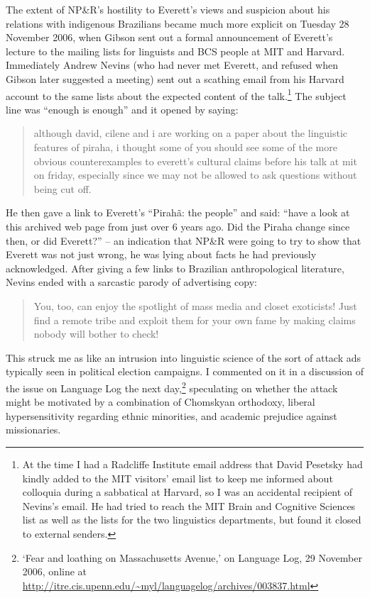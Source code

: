 \documentclass[output=paper,colorlinks,citecolor=brown
]{langscibook}
\begin{document}
The extent of NP\&R's hostility to Everett's views and suspicion about
his relations with indigenous Brazilians became much more explicit
on Tuesday 28 November 2006, when Gibson sent out a formal announcement
of Everett's lecture to the mailing lists for linguists and BCS people
at MIT and Harvard. Immediately Andrew Nevins (who had never met
Everett, and refused when Gibson later suggested a meeting) sent out
a scathing email from his Harvard account to the same lists about the
expected content of the talk.\footnote{\label{recipient}%
   At the time I had a Radcliffe Institute email address that David
   Pesetsky had kindly added to the MIT visitors' email list to keep
   me informed about colloquia during a sabbatical at Harvard, so I
   was an accidental recipient of Nevins's email. He had tried to reach
   the MIT Brain and Cognitive Sciences list as well as the lists for
   the two linguistics departments, but found it closed to external
   senders.}
The subject line was ``enough is enough'' and it opened by saying:
\begin{quote}
although david, cilene and i are working on a paper about the
linguistic features of piraha, i thought some of you should see
some of the more obvious counterexamples to everett's cultural
claims before his talk at mit on friday, especially since we may
not be allowed to ask questions without being cut off.
\end{quote}
He then gave a link to Everett's ``Pirah{\~a}: the people'' and said:
``have a look at this archived web page from just over 6 years ago.
Did the Piraha change since then, or did Everett?'' -- an indication
that NP\&R were going to try to show that Everett was not just wrong,
he was lying about facts he had previously acknowledged. After giving
a few links to Brazilian anthropological literature,  Nevins ended
with a sarcastic parody of advertising copy:
\begin{quote}
You, too, can enjoy the spotlight of mass media
and closet exoticists! Just find a remote tribe and exploit them
for your own fame by making claims nobody will bother to check!
\end{quote}

This struck me as like an intrusion into linguistic science of the
sort of attack ads typically seen in political election campaigns.
I commented on it in a discussion of the issue on Language Log
the next day,\footnote{\label{languagelog}%
   `Fear and loathing on Massachusetts Avenue,' on Language Log,
   29 November 2006, online at
   \url{http://itre.cis.upenn.edu/~myl/languagelog/archives/003837.html}}
speculating on whether the attack might be motivated by a combination of
Chomskyan orthodoxy, liberal hypersensitivity regarding ethnic minorities,
and academic prejudice against missionaries.
\end{document}

